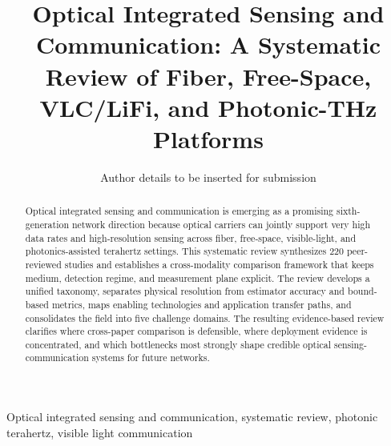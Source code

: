 \documentclass[10pt,journal]{IEEEtran}
\title{Optical Integrated Sensing and Communication: A Systematic Review of Fiber, Free-Space, VLC/LiFi, and Photonic-THz Platforms}
\author{Author details to be inserted for submission}
\begin{document}
\maketitle

\begin{abstract}
Optical integrated sensing and communication is emerging as a promising sixth-generation network direction because optical carriers can jointly support very high data rates and high-resolution sensing across fiber, free-space, visible-light, and photonics-assisted terahertz settings. This systematic review synthesizes 220 peer-reviewed studies and establishes a cross-modality comparison framework that keeps medium, detection regime, and measurement plane explicit. The review develops a unified taxonomy, separates physical resolution from estimator accuracy and bound-based metrics, maps enabling technologies and application transfer paths, and consolidates the field into five challenge domains. The resulting evidence-based review clarifies where cross-paper comparison is defensible, where deployment evidence is concentrated, and which bottlenecks most strongly shape credible optical sensing-communication systems for future networks.
\end{abstract}

\begin{IEEEkeywords}
Optical integrated sensing and communication, systematic review, photonic terahertz, visible light communication
\end{IEEEkeywords}

\end{document}

